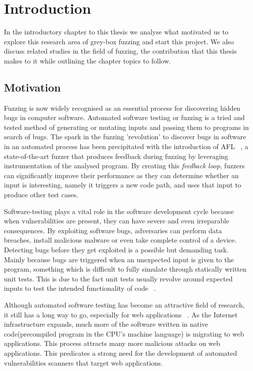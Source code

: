 \chapter{Introduction}
\minitoc
\vspace*{1cm}

In the introductory chapter to this thesis we analyse what motivated us to explore this research area of grey-box fuzzing and start this project. We also discuss related studies in the field of fuzzing, the contribution that this thesis makes to it while outlining the chapter topics to follow.

\section{Motivation}
Fuzzing is now widely recognised as an essential process for discovering hidden bugs in computer software. Automated software testing or fuzzing is a tried and tested method of generating or mutating inputs and passing them to programs in search of bugs. The spark in the fuzzing 'revolution' to discover bugs in software in an automated process has been precipitated with the introduction of AFL ~\cite{zalewski2015american}, a state-of-the-art fuzzer that produces feedback during fuzzing by leveraging instrumentation of the analysed program. By creating this \textit{feedback loop}, fuzzers can significantly improve their performance as they can determine whether an input is interesting, namely it triggers a new code path, and uses that input to produce other test cases.

Software-testing plays a vital role in the software development cycle because when vulnerabilities are present, they can have severe and even irreparable consequences. By exploiting software bugs, adversaries can perform data breaches, install malicious malware or even take complete control of a device. Detecting bugs before they get exploited is a possible but demanding task. Mainly because bugs are triggered when an unexpected input is given to the program, something which is difficult to fully simulate through statically written unit tests. This is due to the fact unit tests usually revolve around expected inputs to test the intended functionality of code ~\cite{aschermann2019nautilus}.

Although automated software testing has become an attractive field of research, it still has a long way to go, especially for web applications ~\cite{doupe2010johnny}. As the Internet infrastructure expands, much more of the software written in native code(precompiled program in the CPU's machine language) is migrating to web applications. This process attracts many more malicious attacks on web applications. This predicates a strong need for the development of automated vulnerabilities scanners that target web applications.
 
